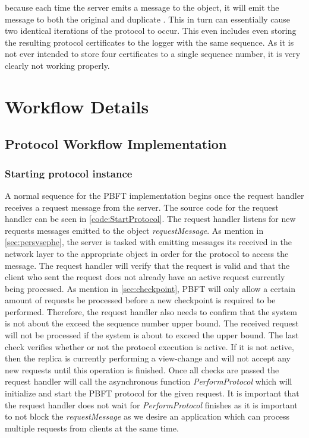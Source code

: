 because each time the server emits a message to the  object, it will emit the message to both the original and duplicate . This in turn can essentially cause two identical iterations of the protocol to occur. This even includes even storing the resulting protocol certificates to the logger with the same sequence. As it is not ever intended to store four certificates to a single sequence number, it is very clearly not working properly. 

\section{Workflow Details}

\subsection{Protocol Workflow Implementation}

\subsubsection{Starting protocol instance}
A normal sequence for the PBFT implementation begins once the request handler receives a request message from the server. The source code for the request handler can be seen in \autoref{code:StartProtocol}. The request handler listens for new requests messages emitted to the  object \emph{requestMessage}. As mention in \autoref{sec:persvsephe}, the server is tasked with emitting messages its received in the network layer to the appropriate  object in order for the protocol to access the message. The request handler will verify that the request is valid and that the client who sent the request does not already have an active request currently being processed. As mention in \autoref{sec:checkpoint}, PBFT will only allow a certain amount of requests be processed before a new checkpoint is required to be performed. Therefore, the request handler also needs to confirm that the system is not about the exceed the sequence number upper bound. The received request will not be processed if the system is about to exceed the upper bound. The last check verifies whether or not the protocol execution is active. If it is not active, then the replica is currently performing a view-change and will not accept any new requests until this operation is finished. Once all checks are passed the request handler will call the asynchronous  function \emph{PerformProtocol} which will initialize and start the PBFT protocol for the given request. It is important that the request handler does not wait for \emph{PerformProtocol} finishes as it is important to not block the \emph{requestMessage} as we desire an application which can process multiple requests from clients at the same time. 

